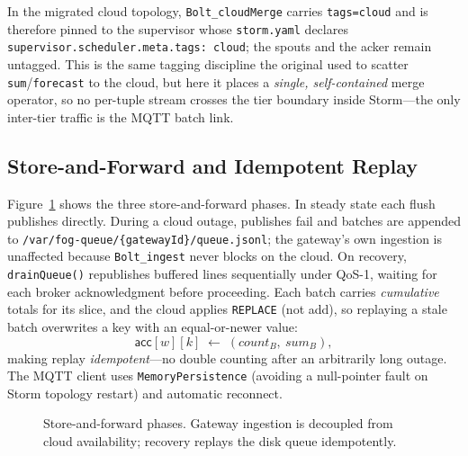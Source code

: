 \documentclass[conference]{IEEEtran}
\newcommand{\code}[1]{\texttt{#1}}
\begin{document}
In the migrated cloud topology, \code{Bolt\_cloudMerge} carries \code{tags=cloud}
and is therefore pinned to the supervisor whose \code{storm.yaml} declares
\code{supervisor.scheduler.meta.tags: cloud}; the spouts and the acker remain
untagged. This is the same tagging discipline the original used to scatter
\code{sum}/\code{forecast} to the cloud, but here it places a \emph{single,
self-contained} merge operator, so no per-tuple stream crosses the tier boundary
inside Storm---the only inter-tier traffic is the MQTT batch link.

\subsection{Store-and-Forward and Idempotent Replay}\label{sec:arch-saf}
Figure~\ref{fig:saf} shows the three store-and-forward phases. In steady state
each flush publishes directly. During a cloud outage, publishes fail and batches
are appended to \code{/var/fog-queue/\{gatewayId\}/queue.jsonl}; the gateway's own
ingestion is unaffected because \code{Bolt\_ingest} never blocks on the cloud. On
recovery, \code{drainQueue()} republishes buffered lines sequentially under
QoS-1, waiting for each broker acknowledgment before proceeding. Each batch
carries \emph{cumulative} totals for its slice, and the cloud applies
\code{REPLACE} (not add), so replaying a stale batch overwrites a key with an
equal-or-newer value:
\begin{equation}
\textsf{acc}[w][k] \;\leftarrow\; (\textit{count}_B,\ \textit{sum}_B),
\label{eq:replace}
\end{equation}
making replay \emph{idempotent}---no double counting after an arbitrarily long
outage. The MQTT client uses \code{MemoryPersistence} (avoiding a null-pointer
fault on Storm topology restart) and automatic reconnect.

\begin{figure}[t]
\centering
{}
\caption{Store-and-forward phases. Gateway ingestion is decoupled from cloud
availability; recovery replays the disk queue idempotently.}
\label{fig:saf}
\end{figure}
\end{document}
